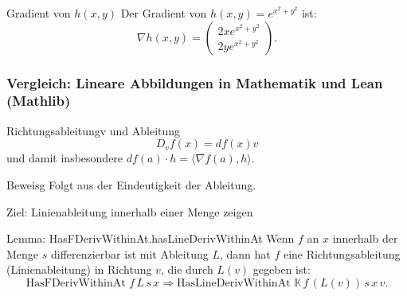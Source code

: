 \documentclass{beamer}
\begin{document}
    \begin{frame}
        \begin{block}{Gradient von \( h(x, y) \)}
            Der Gradient von \( h(x, y) = e^{x^2 + y^2} \) ist:
            \[
            \nabla h(x, y) = \begin{pmatrix} 2x e^{x^2 + y^2} \\ 2y e^{x^2 + y^2} \end{pmatrix}.
            \]
        \end{block}
 
    \end{frame}
    
    
         
    \begin{frame}
        \frametitle{Vergleich: Lineare Abbildungen in Mathematik und Lean (Mathlib)}
        
        
        \begin{block}{Richtungsableitungv und Ableitung}
            \[
                D_v f (x) = df(x) v
            \]
            und damit insbesondere  $df(a) \cdot h = \langle \nabla f (a) , h \rangle$.
        \end{block}

        \begin{block}{Beweisg}
            Folgt aus der Eindeutigkeit der Ableitung.
        \end{block}
    \end{frame}

    


    \begin{frame}{Ziel: Linienableitung innerhalb einer Menge zeigen}
        \begin{block}{Lemma: HasFDerivWithinAt.hasLineDerivWithinAt}
            Wenn \( f \) an \( x \) innerhalb der Menge \( s \) differenzierbar ist mit Ableitung \( L \), dann hat \( f \) eine Richtungsableitung (Linienableitung) in Richtung \( v \), die durch \( L(v) \) gegeben ist:
            \[
            \text{HasFDerivWithinAt } f \, L \, s \, x \Rightarrow \text{HasLineDerivWithinAt } \mathbb{K} \, f \, (L(v)) \, s \, x \, v.
            \]
        \end{block}
    \end{frame}
    
\end{document}

